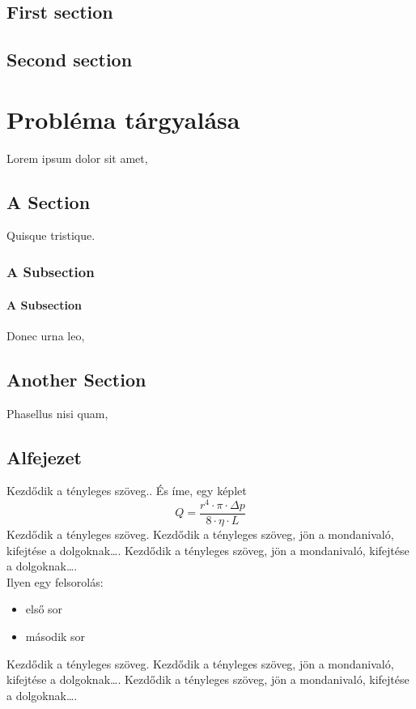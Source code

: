 \documentclass[a4paper,12pt,oneside]{book}
\begin{document}
\section{First section}

\section{Second section}

\chapter{Probléma tárgyalása}
Lorem ipsum dolor sit amet,

\section{A Section}

Quisque tristique.

\subsection{A Subsection}
\subsubsection{A Subsection}

Donec urna leo, 

\section{Another Section}

Phasellus nisi quam, 

\section{Alfejezet}
Kezdődik a tényleges szöveg..
És íme, egy képlet
\begin{equation}
Q=\frac{r^4\cdot \pi \cdot \Delta p}{8\cdot \eta\cdot L}
\end{equation}
Kezdődik a tényleges szöveg. Kezdődik a tényleges szöveg, jön a mondanivaló, kifejtése a dolgoknak…. Kezdődik a tényleges szöveg, jön a mondanivaló, kifejtése a dolgoknak….\\

Ilyen egy felsorolás:
\begin{itemize}
	\item első sor
	\item második sor
\end{itemize}
Kezdődik a tényleges szöveg. Kezdődik a tényleges szöveg, jön a mondanivaló, kifejtése a dolgoknak…. Kezdődik a tényleges szöveg, jön a mondanivaló, kifejtése a dolgoknak….\\
\end{document}
